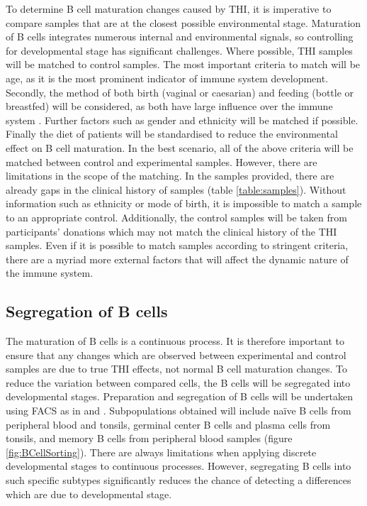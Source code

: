 \documentclass[12pt]{article}
\newcommand{\naive}{na\"{i}ve }
\begin{document}
				To determine B cell maturation changes caused by THI, it is imperative to compare samples that are at the closest possible environmental stage.
				Maturation of B cells integrates numerous internal and environmental signals, so controlling for developmental stage has significant challenges. 
				Where possible, THI samples will be matched to control samples. 
				The most important criteria to match will be age, as it is the most prominent indicator of immune system development. 
				Secondly, the method of both birth (vaginal or caesarian) and feeding (bottle or breastfed) will be considered, as both have large influence over the immune system \citep{Jakobsson14,Cho13,Brandtzaeg03,Rogier14,Gomez14}.
				Further factors such as gender and ethnicity will be matched if possible. 
				Finally the diet of patients will be standardised to reduce the environmental effect on B cell maturation.
				In the best scenario, all of the above criteria will be matched between control and experimental samples. 
				However, there are limitations in the scope of the matching. 
				In the samples provided, there are already gaps in the clinical history of samples (table \ref{table:samples}). 
				Without information such as ethnicity or mode of birth, it is impossible to match a sample to an appropriate control. 
				Additionally, the control samples will be taken from participants' donations which may not match the clinical history of the THI samples.
				Even if it is possible to match samples according to stringent criteria, there are a myriad more external factors that will affect the dynamic nature of the immune system.
				 
				
		
		\subsection{Segregation of B cells}
			
			The maturation of B cells is a continuous process. 
			It is therefore important to ensure that any changes which are observed between experimental and control samples are due to true THI effects, not normal B cell maturation changes.
			To reduce the variation between compared cells, the B cells will be segregated into developmental stages. 
			Preparation and segregation of B cells will be undertaken using FACS as in \citet{Kulis15} and \citet{Oakes16}.
			Subpopulations obtained will include \naive B cells from peripheral blood and tonsils, germinal center B cells and plasma cells from tonsils, and memory B cells from peripheral blood samples (figure \ref{fig:BCellSorting}). 
			There are always limitations when applying discrete developmental stages to continuous processes.
			However, segregating B cells into such specific subtypes significantly reduces the chance of detecting a differences which are due to developmental stage. 
			
\end{document}
